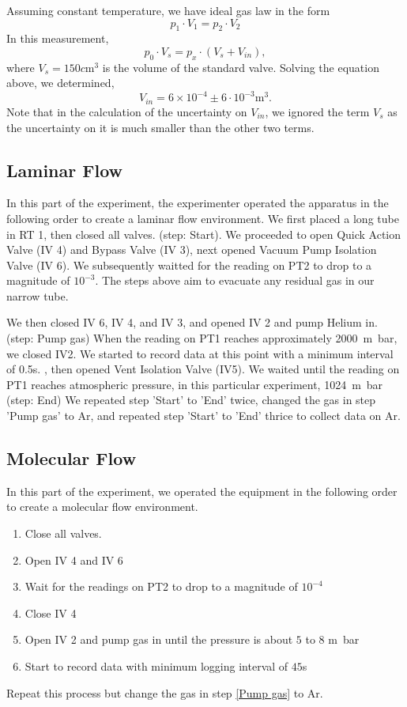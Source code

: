 \documentclass[12pt,a4paper]{article}
\begin{document}
	Assuming constant temperature, we have ideal gas law in the form\\
	\begin{equation*}
		p_1 \cdot V_1 = p_2 \cdot V_2
	\end{equation*}
	In this measurement,\\
	\begin{equation*}
		p_0 \cdot V_s = p_x \cdot (V_s+V_{in}),
	\end{equation*}
	where $V_s=150 \si{c\metre^3}$ is the volume of the standard valve.
	Solving the equation above, we determined, 
	$$V_{in}= 6 \times 10 ^{-4} \pm 6 \cdot 10^{-3} \si{\metre^3}.$$
	Note that in the calculation of the uncertainty on $V_{in}$, we ignored the term $V_s$ as the uncertainty on it is much smaller than the other two terms.
		
	
	\subsection{Laminar Flow}		
	In this part of the experiment, the experimenter operated the apparatus in the following order to create a laminar flow environment.
	We first placed a long tube in RT 1, then closed all valves.
	(step: Start). 
	We proceeded to open Quick Action Valve (IV 4) and Bypass Valve (IV 3), next opened Vacuum Pump Isolation Valve (IV 6). We subsequently waitted for the reading on PT2 to drop to a magnitude of $10^{-3}$. The steps above aim to evacuate any residual gas in our narrow tube.
		
	We then closed IV 6, IV 4, and IV 3, and opened IV 2 and pump Helium in. 
	(step: Pump gas)
	When the reading on PT1 reaches approximately \SI{2000}{m\bar}, we closed IV2. We started to record data at this point with a minimum interval of 0.5s.
		, then opened Vent Isolation Valve (IV5). We waited until the reading on PT1 reaches atmospheric pressure, in this particular experiment, \SI{1024}{m\bar} 
	(step: End)
	We repeated step 'Start' to 'End' twice, changed the gas in step 'Pump gas' to Ar, and repeated step 'Start' to 'End' thrice to collect data on Ar.
	\subsection{Molecular Flow}	
	In this part of the experiment, we operated the equipment in the following order to create a molecular flow environment.
	\begin{enumerate}
		\item Close all valves.
		\item Open IV 4 and IV 6
		\item Wait for the readings on PT2 to drop to a magnitude of $10^{-4}$
		\item Close IV 4
		\item Open IV 2 and pump gas in until the pressure is about $5$ to $8$ \si{m\bar}\label{Pump gas}
		\item Start to record data with minimum logging interval of  $45$\si{\second}
	\end{enumerate}
	Repeat this process but change the gas in step \ref{Pump gas} to Ar.
\end{document}
